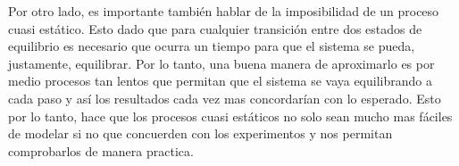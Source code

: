 \documentclass{report}
\begin{document}
Por otro lado, es importante también hablar de la imposibilidad de un proceso cuasi estático. Esto dado que para cualquier transición entre dos estados de equilibrio es necesario que ocurra un tiempo para que el sistema se pueda, justamente, equilibrar. Por lo tanto, una buena manera de aproximarlo es por medio procesos tan lentos que permitan que el sistema se vaya equilibrando a cada paso y así los resultados cada vez mas concordarían con lo esperado. Esto por lo tanto, hace que los procesos cuasi estáticos no solo sean mucho mas fáciles de modelar si no que concuerden con los experimentos y nos permitan comprobarlos de manera practica.
\end{document}
